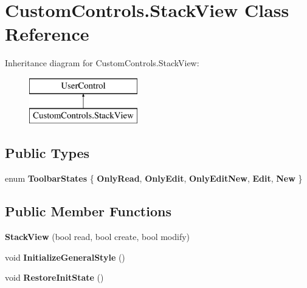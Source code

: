 \hypertarget{class_custom_controls_1_1_stack_view}{}\section{Custom\+Controls.\+Stack\+View Class Reference}
\label{class_custom_controls_1_1_stack_view}
Inheritance diagram for Custom\+Controls.\+Stack\+View\+:\begin{figure}[H]
\begin{center}
\leavevmode
\includegraphics[height=2.000000cm]{class_custom_controls_1_1_stack_view}
\end{center}
\end{figure}
\subsection*{Public Types}
\begin{DoxyCompactItemize}
\item 
\mbox{\label{class_custom_controls_1_1_stack_view_ad33a71dff7cc2c25851d7cd5d75fb3c8}} 
enum {\bfseries Toolbar\+States} \{ \newline
{\bfseries Only\+Read}, 
{\bfseries Only\+Edit}, 
{\bfseries Only\+Edit\+New}, 
{\bfseries Edit}, 
\newline
{\bfseries New}
 \}
\end{DoxyCompactItemize}
\subsection*{Public Member Functions}
\begin{DoxyCompactItemize}
\item 
\mbox{\label{class_custom_controls_1_1_stack_view_af1226e4d40a4f58799de5b48de95c275}} 
{\bfseries Stack\+View} (bool read, bool create, bool modify)
\item 
\mbox{\label{class_custom_controls_1_1_stack_view_a40e9b83536de3aa4a3fd7e40bfce0246}} 
void {\bfseries Initialize\+General\+Style} ()
\item 
\mbox{\label{class_custom_controls_1_1_stack_view_aa6ee6db47352fbb47bc1292ea7f58611}} 
void {\bfseries Restore\+Init\+State} ()
\end{DoxyCompactItemize}

